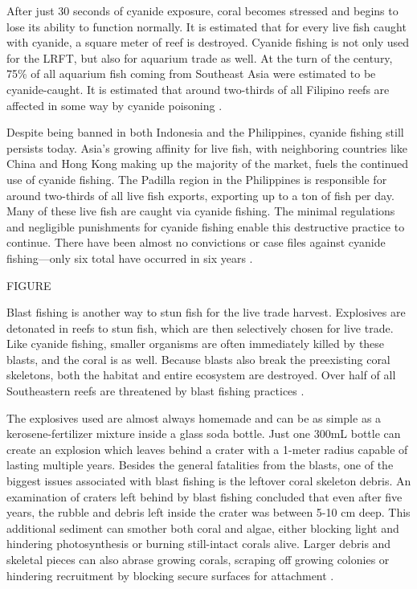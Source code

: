 \documentclass{book}\usepackage{knitr}
\begin{document}
\begin{knitrout}
\begin{kframe}
	After just 30 seconds of cyanide exposure, coral becomes stressed and begins to lose its ability to function normally. It is estimated that for every live fish caught with cyanide, a square meter of reef is destroyed. Cyanide fishing is not only used for the LRFT, but also for aquarium trade as well. At the turn of the century, 75\% of all aquarium fish coming from Southeast Asia were estimated to be cyanide-caught. It is estimated that around two-thirds of all Filipino reefs are affected in some way by cyanide poisoning \citep{970313024119970301}.

Despite being banned in both Indonesia and the Philippines, cyanide fishing still persists today. Asia’s growing affinity for live fish, with neighboring countries like China and Hong Kong making up the majority of the market, fuels the continued use of cyanide fishing. The Padilla region in the Philippines is responsible for around two-thirds of all live fish exports, exporting up to a ton of fish per day. Many of these live fish are caught via cyanide fishing. The minimal regulations and negligible punishments for cyanide fishing enable this destructive practice to continue. There have been almost no convictions or case files against cyanide fishing—only six total have occurred in six years \citep{wwfcyanide}.

FIGURE

Blast fishing is another way to stun fish for the live trade harvest. Explosives are detonated in reefs to stun fish, which are then selectively chosen for live trade. Like cyanide fishing, smaller organisms are often immediately killed by these blasts, and the coral is as well. Because blasts also break the preexisting coral skeletons, both the habitat and entire ecosystem are destroyed.  Over half of all Southeastern reefs are threatened by blast fishing practices \citep{https://doi.org/10.1890/1051-0761(2006)016[1631:RFBFOC]2.0.CO;2}. 
  
The explosives used are almost always homemade and can be as simple as a kerosene-fertilizer mixture inside a glass soda bottle. Just one 300mL bottle can create an explosion which leaves behind a crater with a 1-meter radius capable of lasting multiple years. Besides the general fatalities from the blasts, one of the biggest issues associated with blast fishing is the leftover coral skeleton debris. An examination of craters left behind by blast fishing concluded that even after five years, the rubble and debris left inside the crater was between 5-10 cm deep. This additional sediment can smother both coral and algae, either blocking light and hindering photosynthesis or burning still-intact corals alive. Larger debris and skeletal pieces can also abrase growing corals, scraping off growing colonies or hindering recruitment by blocking secure surfaces for attachment \citep{https://doi.org/10.1890/1051-0761(2006)016[1631:RFBFOC]2.0.CO;2}. 


\end{kframe}
\end{knitrout}
\end{document}
